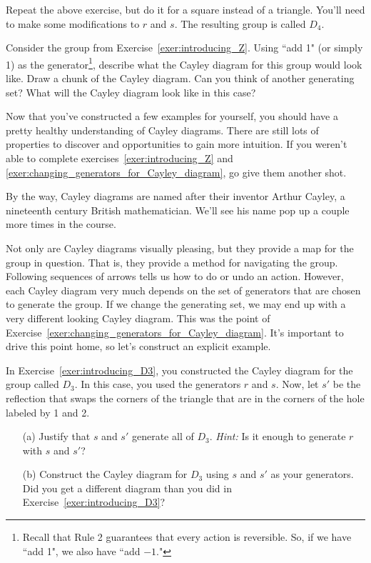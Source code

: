 \begin{exercise}\label{exer:introducing_D4}
Repeat the above exercise, but do it for a square instead of a triangle.  You'll need to make some modifications to $r$ and $s$.  The resulting group is called $D_4$.
\end{exercise}

\begin{exercise}
Consider the group from Exercise~\ref{exer:introducing_Z}.  Using ``add 1" (or simply 1) as the generator\footnote{Recall that Rule 2 guarantees that every action is reversible.  So, if we have ``add 1", we also have ``add $-1$."}, describe what the Cayley diagram for this group would look like.  Draw a chunk of the Cayley diagram.  Can you think of another generating set?  What will the Cayley diagram look like in this case?
\end{exercise}

Now that you've constructed a few examples for yourself, you should have a pretty healthy understanding of Cayley diagrams.  There are still lots of properties to discover and opportunities to gain more intuition.  If you weren't able to complete exercises~\ref{exer:introducing_Z} and \ref{exer:changing_generators_for_Cayley_diagram}, go give them another shot.

By the way, Cayley diagrams are named after their inventor Arthur Cayley, a nineteenth century British mathematician.  We'll see his name pop up a couple more times in the course.  

Not only are Cayley diagrams visually pleasing, but they provide a map for the group in question.  That is, they provide a method for navigating the group.  Following sequences of arrows tells us how to do or undo an action.  However, each Cayley diagram very much depends on the set of generators that are chosen to generate the group.  If we change the generating set, we may end up with a very different looking Cayley diagram.  This was the point of Exercise~\ref{exer:changing_generators_for_Cayley_diagram}.  It's important to drive this point home, so let's construct an explicit example.

\begin{exercise}\label{exer:alternate_D3}
In Exercise~\ref{exer:introducing_D3}, you constructed the Cayley diagram for the group called $D_3$.  In this case, you used the generators $r$ and $s$.  Now, let $s'$ be the reflection that swaps the corners of the triangle that are in the corners of the hole labeled by 1 and 2.  
\begin{enumerate}
\item[(a)] Justify that $s$ and $s'$ generate all of $D_3$.  \emph{Hint:} Is it enough to generate $r$ with $s$ and $s'$?
\item[(b)] Construct the Cayley diagram for $D_3$ using $s$ and $s'$ as your generators.  Did you get a different diagram than you did in Exercise~\ref{exer:introducing_D3}?
\end{enumerate}
\end{exercise}

